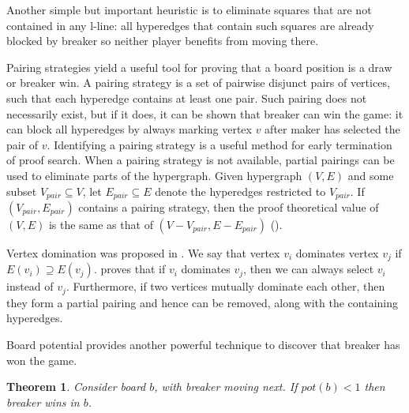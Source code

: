 \documentclass[conference]{IEEEtran}
\newtheorem{theorem}{Theorem}[section]
\theoremstyle{definition}
\begin{document}
Another simple but important heuristic is to eliminate squares that are not contained in any l-line: all hyperedges that contain such squares are already blocked by breaker so neither player benefits from moving there.

Pairing strategies \cite{Hales1987, BerlekampElwynR1983Wwfy,UITERWIJK200043,inf_inf_8} yield a useful tool for proving that a board position is a draw or breaker win. A pairing strategy is a set of pairwise disjunct pairs of vertices, such that each hyperedge contains at least one pair. Such pairing does not necessarily exist, but if it does, it can be shown that breaker can win the game: it can block all hyperedges by always marking vertex $v$ after maker has selected the pair of $v$. Identifying a pairing strategy is a useful method for early termination of proof search. When a pairing strategy is not available, partial pairings can be used to eliminate parts of the hypergraph. Given hypergraph $(V, E)$ and some subset $V_{pair} \subseteq V$, let $E_{pair} \subseteq E$ denote the hyperedges restricted to $V_{pair}$. If $(V_{pair}, E_{pair})$ contains a pairing strategy, then the proof theoretical value of $(V, E)$ is the same as that of $(V - V_{pair}, E - E_{pair})$ (\cite{HSU202079}).

Vertex domination was proposed in \cite{HSU202079}. We say that vertex $v_i$ dominates vertex $v_j$ if $E(v_i) \supseteq E(v_j)$. \cite{HSU202079} proves that if $v_i$ dominates $v_j$, then we can always select $v_i$ instead of $v_j$. Furthermore, if two vertices mutually dominate each other, then they form a partial pairing and hence can be removed, along with the containing hyperedges.

Board potential provides another powerful technique to discover that breaker has won the game.

\begin{theorem}
\label{thm:breaker_win}
Consider board $b$, with breaker moving next. If $pot(b) < 1$ then breaker wins in $b$.
\end{theorem}
\end{document}
